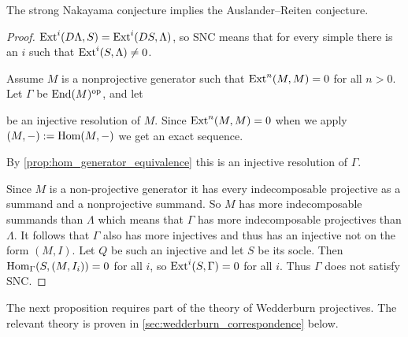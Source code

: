 \begin{theorem}
	The strong Nakayama conjecture implies the Auslander--Reiten conjecture.
	\begin{proof}
		$\operatorname{Ext}^i(D\Lambda, S) = \operatorname{Ext}^i(DS, \Lambda)$, so SNC means that for every simple there is an $i$ such that $\operatorname{Ext}^i(S, \Lambda) \neq 0$.
		
		Assume $M$ is a nonprojective generator such that $\operatorname{Ext}^n(M, M)=0$ for all $n>0$. Let $\Gamma$ be $\operatorname{End}(M)^{\operatorname{op}}$, and let
		\begin{center}
		\end{center}
		be an injective resolution of $M$. Since $\operatorname{Ext}^n(M,M)=0$ when we apply $(M,-):=\operatorname{Hom}(M,-)$ we get an exact sequence.
		\begin{center}
		\end{center}
		By \cref{prop:hom_generator_equivalence} this is an injective resolution of $\Gamma$.
		
		Since $M$ is a non-projective generator it has every indecomposable projective as a summand and a nonprojective summand. So $M$ has more indecomposable summands than $\Lambda$ which means that $\Gamma$ has more indecomposable projectives than $\Lambda$. It follows that $\Gamma$ also has more injectives and thus has an injective not on the form $(M, I)$. Let $Q$ be such an injective and let $S$ be its socle. Then $\operatorname{Hom}_\Gamma(S, (M, I_i)) = 0$ for all $i$, so $\operatorname{Ext}^i(S, \Gamma) = 0$ for all $i$. Thus $\Gamma$ does not satisfy SNC.
	\end{proof}
\end{theorem}

The next proposition requires part of the theory of Wedderburn projectives. The relevant theory is proven in \cref{sec:wedderburn_correspondence} below.

